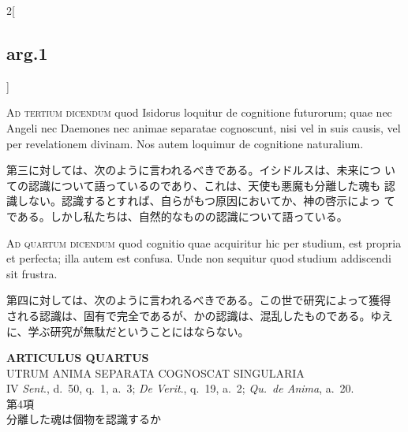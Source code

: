 \documentclass[paper=a4paper,fontsize=10pt,jafontsize=9pt,titlepage]{jlreq}
\begin{document}
\begin{paracol}{2}[\subsection{arg.1}]
\switchcolumn*[\subsection{ad.3}]

{\scshape Ad tertium dicendum} quod Isidorus loquitur de cognitione
futurorum; quae nec Angeli nec Daemones nec animae separatae
cognoscunt, nisi vel in suis causis, vel per revelationem divinam. Nos
autem loquimur de cognitione naturalium.

\switchcolumn

第三に対しては、次のように言われるべきである。イシドルスは、未来につ
いての認識について語っているのであり、これは、天使も悪魔も分離した魂も
認識しない。認識するとすれば、自らがもつ原因においてか、神の啓示によっ
てである。しかし私たちは、自然的なものの認識について語っている。

\switchcolumn*[\subsection{ad.4}]

{\scshape Ad quartum dicendum} quod cognitio quae acquiritur hic per
studium, est propria et perfecta; illa autem est confusa. Unde non
sequitur quod studium addiscendi sit frustra.

\switchcolumn

第四に対しては、次のように言われるべきである。この世で研究によって獲得
される認識は、固有で完全であるが、かの認識は、混乱したものである。ゆえ
に、学ぶ研究が無駄だということにはならない。

\end{paracol}

\newpage
{}


{}
\setcounter{section}{4}
\setcounter{subsection}{0}
\begin{center}
{\Large {\bfseries ARTICULUS QUARTUS}}\\ {\large UTRUM ANIMA SEPARATA
COGNOSCAT SINGULARIA}\\ {\footnotesize IV {\itshape Sent}., d.~50, q.~1,
a.~3; {\itshape De Verit}., q.~19, a.~2; {\itshape Qu.~de Anima}, a.~20.}\\
{\Large 第4項\\分離した魂は個物を認識するか}
\end{center}
\end{document}
